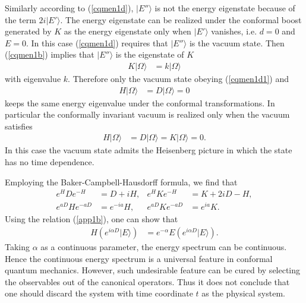 \documentclass[12pt]{article}
\numberwithin{equation}{section}
\begin{document}
Similarly according to (\ref{cqmen1d}), 
$|E''\rangle$ is not the energy eigenstate 
because of the term $2i|E'\rangle$. 
The energy eigenstate can be realized under the conformal boost 
generated by $K$ as the energy eigenstate 
only when $|E'\rangle$ vanishes, i.e. $d=0$ and $E=0$. 
In this case (\ref{cqmen1d}) requires that 
$|E''\rangle$ is the vacuum state. 
Then (\ref{cqmen1b}) implies that 
$|E''\rangle$ is the eigenstate of $K$ 
\begin{align}
\label{cqmen1d1}
K|\Omega\rangle&=k|\Omega\rangle 
\end{align}
with eigenvalue $k$. 
%
Therefore only the vacuum state obeying (\ref{cqmen1d1}) and 
\begin{align}
\label{cqmen1e}
H|\Omega\rangle&=D|\Omega\rangle=0
\end{align}
keeps the same energy eigenvalue under the conformal transformations. 
In particular the conformally invariant vacuum is realized 
only when the vacuum satisfies
\begin{align}
\label{cqmen1f}
H|\Omega\rangle&=D|\Omega\rangle=K|\Omega\rangle=0.
\end{align}
In this case the vacuum state admits the Heisenberg picture 
in which the state has no time dependence. 










Employing the Baker-Campbell-Hausdorff formula, 
we find that 
\begin{align}
\label{app1a}
e^{H}De^{-H}&=D+iH,& e^{H}Ke^{-H}&=K+2iD-H,\\
\label{app1b}
e^{aD}He^{-aD}&=e^{-ia}H,& e^{aD}Ke^{-aD}&=e^{ia}K. 
\end{align}
Using the relation (\ref{app1b}), 
one can show that 
\begin{align}
\label{app1d}
H\left(
e^{i\alpha D}|E\rangle 
\right)&=e^{-\alpha}E
\left(
e^{i\alpha D}|E\rangle 
\right). 
\end{align}
Taking $\alpha$ as 
a continuous parameter, 
the energy spectrum can be continuous. 
Hence the continuous energy spectrum is a universal feature 
in conformal quantum mechanics. 
However, such undesirable feature can be cured by selecting the observables out of the canonical operators. 
Thus it does not conclude that 
one should discard the system with time coordinate $t$ as the physical system. 
\end{document}
